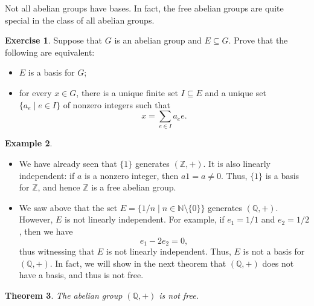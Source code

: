 \documentclass[a4paper]{memoir}
\newtheorem{theorem}{Theorem}[section]
\theoremstyle{definition}
\newtheorem{exercise}[theorem]{Exercise}
\newtheorem{example}[theorem]{Example}
\newcommand{\bb}{\mathbb}
\begin{document}
Not all abelian groups have bases. In fact, the free abelian groups are quite special in 
the class of all abelian groups.

\begin{exercise}
  Suppose that $G$ is an abelian group and $E \subseteq G$. Prove that the following are equivalent:
  \begin{itemize}
    \item $E$ is a basis for $G$;
    \item for every $x \in G$, there is a unique finite set $I \subseteq E$ and a unique 
    set $\{a_e \mid e \in I\}$ of nonzero integers such that
    \[
      x = \sum_{e \in I} a_ee.
    \]
  \end{itemize}
\end{exercise}

\begin{example}
  \begin{itemize}
    \item We have already seen that $\{1\}$ generates $(\bb{Z}, +)$. It is also linearly independent: 
    if $a$ is a nonzero integer, then $a1 = a \neq 0$. Thus, $\{1\}$ is a basis for $\bb{Z}$, and 
    hence $\bb{Z}$ is a free abelian group.
    \item We saw above that the set $E = \{1/n \mid n \in \bb{N} \setminus \{0\}\}$ generates 
    $(\bb{Q}, +)$. However, $E$ is not linearly independent. For example, if 
    $e_1 = 1/1$ and $e_2 = 1/2$, then we have
    \[
      e_1 - 2e_2 = 0,
    \]
    thus witnessing that $E$ is not linearly independent. Thus, $E$ is not a basis for 
    $(\bb{Q}, +)$. In fact, we will show in the next theorem that $(\bb{Q}, +)$ does not have 
    a basis, and thus is not free.
  \end{itemize}
\end{example}

\begin{theorem}
  The abelian group $(\bb{Q}, +)$ is not free.
\end{theorem}
\end{document}
